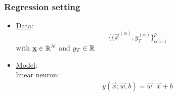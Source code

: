 \begin{frame}\frametitle{Regression setting}


\begin{itemize}
\item[] \underline{Data}:\\
    \begin{equation}
    \big\{ (\vec x^{(\alpha)}, y_{T}^{(\alpha)}\big\}_{\alpha=1}^{p}
    \end{equation}
    with $\underline{\mathbf{x}} \in \mathbb{R}^{N}$ and $y_{T} \in \mathbb{R}${}

\item[] \underline{Model}:\\
    linear neuron:
    \begin{equation}
        y(\vec x; \vec w, b) = \vec w^{\top} \vec x + b
    \end{equation}


    
\end{itemize}



\end{frame}

